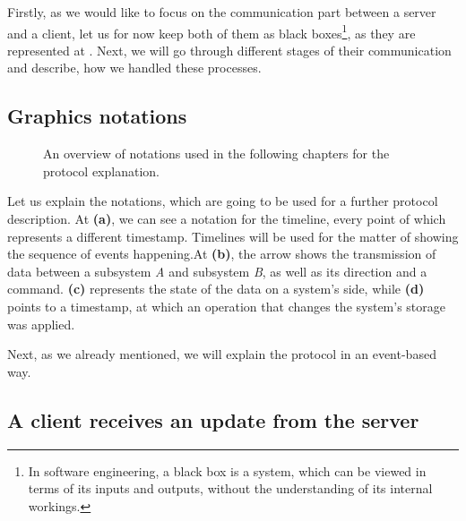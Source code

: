 Firstly, as we would like to focus on the communication part between a server and a client, let us for now keep both of them as black boxes\footnote{In software engineering, a black box is a system, which can be viewed in terms of its inputs and outputs, without the understanding of its internal workings.\cite{49}}, as they are represented at . Next, we will go through different stages of their communication and describe, how we handled these processes. 

\subsection*{Graphics notations}

\begin{figure}[!htb]
    \centering
    \def\svgwidth{0.35\linewidth}
    \subfloat[]{{}}%
    \qquad
    \def\svgwidth{0.35\linewidth}
    \subfloat[]{{}}%
 \def\svgwidth{0.35\linewidth}
    \subfloat[]{{}}%
    \qquad
 \def\svgwidth{0.35\linewidth}
    \subfloat[]{{}}%
    \qquad
    \caption{An overview of notations used in the following chapters for the protocol explanation.}%
    \label{fig:notations}%
\end{figure}

Let us explain the notations, which are going to be used for a further protocol description. At  \textbf{(a)}, we can see a notation for the timeline, every point of which represents a different timestamp. Timelines will be used for the matter of showing the sequence of events happening.At  \textbf{(b)}, the arrow shows the transmission of data between a subsystem \textit{A} and subsystem \textit{B}, as well as its direction and a command.  \textbf{(c)} represents the state of the data on a system's side, while  \textbf{(d)} points to a timestamp, at which an operation that changes the system's storage was applied.

Next, as we already mentioned, we will explain the protocol in an event-based way. 

\subsection*{A client receives an update from the server}

